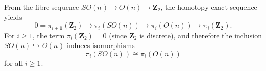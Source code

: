 From the fibre sequence $SO(n) \to O(n) \to \mathbf{Z}_2$, the homotopy exact sequence yields
$$0 = \pi_{i+1}(\mathbf{Z}_2) \to \pi_i(SO(n)) \to \pi_i(O(n)) \to \pi_i(\mathbf{Z}_2).$$
For $i \geq 1$, the term $\pi_i(\mathbf{Z}_2) = 0$ (since $\mathbf{Z}_2$ is discrete), and therefore the inclusion $SO(n) \hookrightarrow O(n)$ induces isomorphisms
$$\pi_i(SO(n)) \cong \pi_i(O(n))$$
for all $i \geq 1$.
